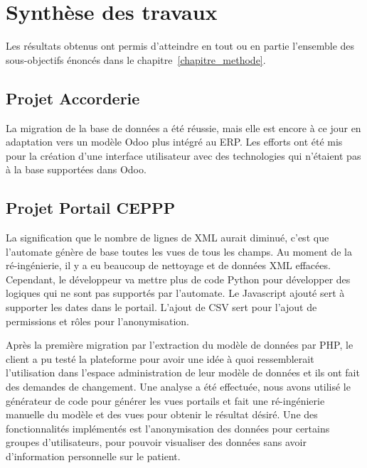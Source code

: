 \label{sec:Conclusion}

\section{Synthèse des travaux}
Les résultats obtenus ont permis d’atteindre en tout ou en partie l’ensemble des sous-objectifs énoncés dans le chapitre~\ref{chapitre_methode}.%

\subsection{Projet Accorderie}
La migration de la base de données a été réussie, mais elle est encore à ce jour en adaptation vers un modèle Odoo plus intégré au ERP. Les efforts ont été mis pour la création d’une interface utilisateur avec des technologies qui n’étaient pas à la base supportées dans Odoo.

\subsection{Projet Portail CEPPP}
La signification que le nombre de lignes de XML aurait diminué, c’est que l’automate génère de base toutes les vues de tous les champs. Au moment de la ré-ingénierie, il y a eu beaucoup de nettoyage et de données XML effacées. Cependant, le développeur va mettre plus de code Python pour développer des logiques qui ne sont pas supportés par l’automate. Le Javascript ajouté sert à supporter les dates dans le portail. L’ajout de CSV sert pour l’ajout de permissions et rôles pour l’anonymisation.

Après la première migration par l’extraction du modèle de données par PHP, le client a pu testé la plateforme pour avoir une idée à quoi ressemblerait l’utilisation dans l’espace administration de leur modèle de données et ils ont fait des demandes de changement. Une analyse a été effectuée, nous avons utilisé le générateur de code pour générer les vues portails et fait une ré-ingénierie manuelle du modèle et des vues pour obtenir le résultat désiré. Une des fonctionnalités implémentés est l’anonymisation des données pour certains groupes d’utilisateurs, pour pouvoir visualiser des données sans avoir d’information personnelle sur le patient.




